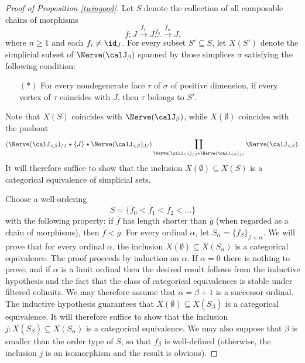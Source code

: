 \begin{proof}[Proof of Proposition \ref{twingood}]
Let $S$ denote the collection of all composable chains of morphisms
$$\overline{f}: J \stackrel{ f_1}{\rightarrow} J \stackrel{ f_2} \ldots \stackrel{f_n}{\rightarrow} J.$$
where $n \geq 1$ and each $f_{i} \neq \id_{J}$. For every subset $S' \subseteq S$, let
$X(S')$ denote the simplicial subset of $\Nerve( \calJ_{\beta})$ spanned by those simplices
$\sigma$ satisfying the following condition:
\begin{itemize}
\item[$(\ast)$] For every nondegenerate face $\tau$ of $\sigma$ of positive dimension, if every
vertex of $\tau$ coincides with $J$, then $\tau$ belongs to $S'$.
\end{itemize}
Note that $X(S)$ coincides with $\Nerve( \calJ_{\beta})$, while $X( \emptyset)$ coincides with
the pushout 
$$(\Nerve (\calJ_{< \beta})_{/J} \star \{ J \} \star \Nerve (\calJ_{< \beta})_{J/})
\coprod_{ \Nerve( \calJ_{< \beta})_{/J} \star \Nerve( \calJ_{< \beta})_{J/}}
\Nerve( \calJ_{< \beta} ). $$
It will therefore suffice to show that the inclusion $X(\emptyset) \subseteq X(S)$ is a
categorical equivalence of simplicial sets.

Choose a well-ordering
$$ S = \{ \overline{f}_0 < \overline{f}_1 < \overline{f}_2 < \ldots \}$$
with the following property: if $\overline{f}$ has length shorter than $\overline{g}$
(when regarded as a chain of morphisms), then $\overline{f} < \overline{g}$.
For every ordinal $\alpha$, let $S_{\alpha} = \{ \overline{f}_{\beta} \}_{\beta < \alpha}$.
We will prove that for every ordinal $\alpha$, the inclusion
$X( \emptyset) \subseteq X( S_{\alpha})$ is a categorical equivalence.
The proof proceeds by induction on $\alpha$. If $\alpha = 0$ there is nothing to prove, and
if $\alpha$ is a limit ordinal then the desired result follows from the inductive hypothesis and the fact that the class of categorical equivalences is stable under filtered colimits. We may therefore assume that
$\alpha = \beta + 1$ is a successor ordinal. The inductive hypothesis guarantees that
$X(\emptyset) \subseteq X( S_{\beta})$ is a categorical equivalence. It will therefore suffice to show that
the inclusion $j: X( S_{\beta} ) \subseteq X( S_{\alpha})$ is a categorical equivalence.
We may also suppose that $\beta$ is smaller than the order type of $S$, so that
$\overline{f}_{\beta}$ is well-defined (otherwise, the inclusion $j$ is an isomorphism and the result is obvious). 


\end{proof}
